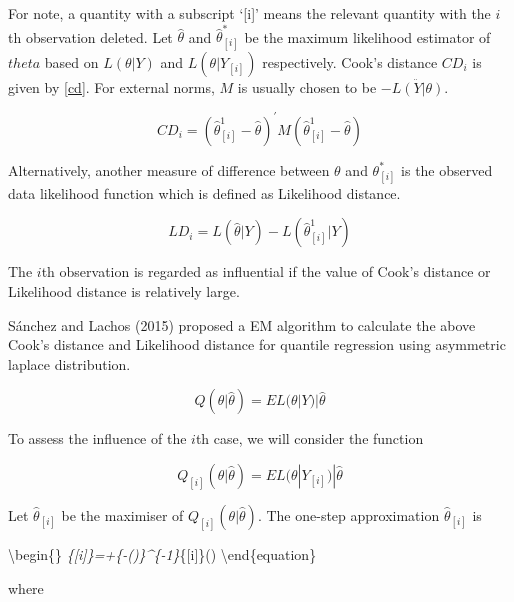 \documentclass[11pt,a4paper,]{article}
\theoremstyle{definition}
\theoremstyle{definition}
\theoremstyle{remark}
\begin{document}
For note, a quantity with a subscript `{[}i{]}' means the relevant
quantity with the \(i\)th observation deleted. Let \(\hat{\theta}\) and
\(\hat{\theta}^{*}_{[i]}\) be the maximum likelihood estimator of
\(theta\) based on \(L(\theta|Y)\) and \(L(\theta|Y_{[i]})\)
respectively. Cook's distance \(CD_{i}\) is given by \ref{cd}. For
external norms, \(M\) is usually chosen to be \(-\ddot{L(Y|\theta)}\).

\begin{equation}
CD_{i}=(\hat{\theta}^{1}_{[i]}-\hat{\theta})^{'}M(\hat{\theta}^{1}_{[i]}-\hat{\theta})
\label{eq:cd}
\end{equation}

Alternatively, another measure of difference between \(\theta\) and
\(\theta^{*}_{[i]}\) is the observed data likelihood function which is
defined as Likelihood distance.

\begin{equation}
LD_i=L(\hat{\theta}|Y)-L(\hat{\theta}^{1}_{[i]}|Y)
\label{eq: ld}
\end{equation}

The \(i\)th observation is regarded as influential if the value of
Cook's distance or Likelihood distance is relatively large.

Sánchez and Lachos (2015) proposed a EM algorithm to calculate the above
Cook's distance and Likelihood distance for quantile regression using
asymmetric laplace distribution.

\begin{equation}
Q(\theta|\hat{\theta})=E{L(\theta|Y)|\hat{\theta}}
\label{eq:q_function}
\end{equation}

To assess the influence of the \(i\)th case, we will consider the
function

\begin{equation}
Q_{[i]}(\theta|\hat{\theta})=E{L(\theta|Y_{[i]})|\hat{\theta}}
\label{eq: q_one_deletion}
\end{equation}

Let \(\hat{\theta}_{[i]}\) be the maximiser of
\(Q_{[i]}(\theta|\hat{\theta})\). The one-step approximation
\(\hat{\theta}_{[i]}\) is

\textbackslash{}begin\{\equation\}
\hat{\theta}\emph{\{{[}i{]}\}=\hat{\theta}+\{-(\hat{\theta}\textbar{}\hat{\theta})\}\^{}\{-1\}}\{{[}i{]}\}(\hat{\theta}\textbar{}\hat{\theta})
\label{eq: estimator} \textbackslash{}end\{equation\}

where
\end{document}
